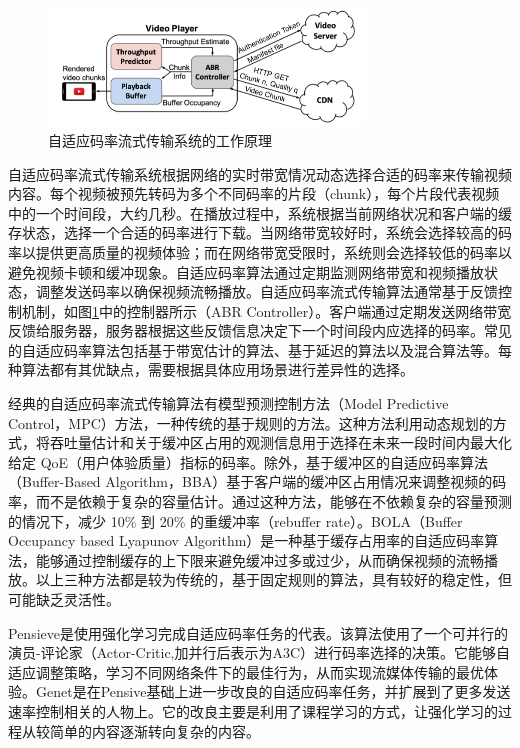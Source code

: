 \begin{figure} [ht]
\centering
\includegraphics[width=0.75\textwidth]{figures/chap02/abrteaser.png} 
\caption{自适应码率流式传输系统的工作原理\cite{mao2017neural}}
\label{fig:abrteaser}
\end{figure}


自适应码率流式传输系统根据网络的实时带宽情况动态选择合适的码率来传输视频内容。每个视频被预先转码为多个不同码率的片段（chunk），每个片段代表视频中的一个时间段，大约几秒。在播放过程中，系统根据当前网络状况和客户端的缓存状态，选择一个合适的码率进行下载。当网络带宽较好时，系统会选择较高的码率以提供更高质量的视频体验；而在网络带宽受限时，系统则会选择较低的码率以避免视频卡顿和缓冲现象。自适应码率算法通过定期监测网络带宽和视频播放状态，调整发送码率以确保视频流畅播放。自适应码率流式传输算法通常基于反馈控制机制，如图\ref{fig:abrteaser}中的控制器所示（ABR Controller）。客户端通过定期发送网络带宽反馈给服务器，服务器根据这些反馈信息决定下一个时间段内应选择的码率。常见的自适应码率算法包括基于带宽估计的算法、基于延迟的算法以及混合算法等。每种算法都有其优缺点，需要根据具体应用场景进行差异性的选择。

经典的自适应码率流式传输算法有模型预测控制方法（Model Predictive Control，MPC）\cite{yin2015control}方法，一种传统的基于规则的方法。这种方法利用动态规划的方式，将吞吐量估计和关于缓冲区占用的观测信息用于选择在未来一段时间内最大化给定 QoE（用户体验质量）指标的码率。除外，基于缓冲区的自适应码率算法（Buffer-Based Algorithm，BBA）\cite{huang2014buffer}基于客户端的缓冲区占用情况来调整视频的码率，而不是依赖于复杂的容量估计。通过这种方法，能够在不依赖复杂的容量预测的情况下，减少 10\% 到 20\% 的重缓冲率（rebuffer rate）。BOLA（Buffer Occupancy based Lyapunov Algorithm）\cite{spiteri2020bola}是一种基于缓存占用率的自适应码率算法，能够通过控制缓存的上下限来避免缓冲过多或过少，从而确保视频的流畅播放。以上三种方法都是较为传统的，基于固定规则的算法，具有较好的稳定性，但可能缺乏灵活性。

Pensieve\cite{mao2017neural}是使用强化学习完成自适应码率任务的代表。该算法使用了一个可并行的演员-评论家（Actor-Critic,加并行后表示为A3C）进行码率选择的决策。它能够自适应调整策略，学习不同网络条件下的最佳行为，从而实现流媒体传输的最优体验。Genet\cite{xia2022genet}是在Pensive基础上进一步改良的自适应码率任务，并扩展到了更多发送速率控制相关的人物上。它的改良主要是利用了课程学习的方式，让强化学习的过程从较简单的内容逐渐转向复杂的内容。



